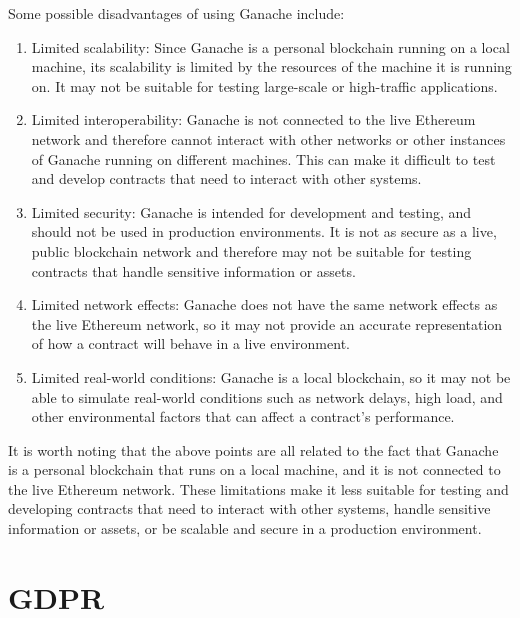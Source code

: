 \documentclass[target=mst,aauheader=]{thud}
\begin{document}
Some possible disadvantages of using Ganache include:

\begin{enumerate}

    \item Limited scalability: Since Ganache is a personal blockchain running on a local machine, its scalability is limited by the resources of the machine it is running on. It may not be suitable for testing large-scale or high-traffic applications.
    \item Limited interoperability: Ganache is not connected to the live Ethereum network and therefore cannot interact with other networks or other instances of Ganache running on different machines. This can make it difficult to test and develop contracts that need to interact with other systems.
    \item Limited security: Ganache is intended for development and testing, and should not be used in production environments. It is not as secure as a live, public blockchain network and therefore may not be suitable for testing contracts that handle sensitive information or assets.
    \item Limited network effects: Ganache does not have the same network effects as the live Ethereum network, so it may not provide an accurate representation of how a contract will behave in a live environment.
    \item Limited real-world conditions: Ganache is a local blockchain, so it may not be able to simulate real-world conditions such as network delays, high load, and other environmental factors that can affect a contract's performance.

\end{enumerate}

It is worth noting that the above points are all related to the fact that Ganache is a personal blockchain that runs on a local machine, and it is not connected to the live Ethereum network. These limitations make it less suitable for testing and developing contracts that need to interact with other systems, handle sensitive information or assets, or be scalable and secure in a production environment.

\chapter{GDPR}
\end{document}
